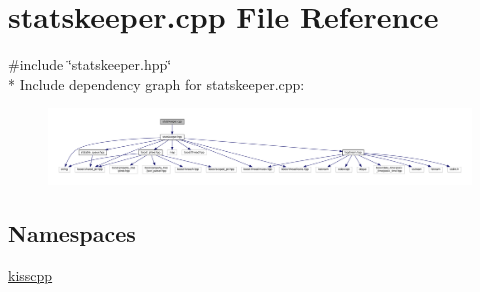 \hypertarget{a00081}{\section{statskeeper.\-cpp File Reference}
\label{a00081}
}
{\ttfamily \#include \char`\"{}statskeeper.\-hpp\char`\"{}}\\*
Include dependency graph for statskeeper.\-cpp\-:\nopagebreak
\begin{figure}[H]
\begin{center}
\leavevmode
\includegraphics[width=350pt]{a00130}
\end{center}
\end{figure}
\subsection*{Namespaces}
\begin{DoxyCompactItemize}
\item 
\hyperlink{a00089}{kisscpp}
\end{DoxyCompactItemize}
